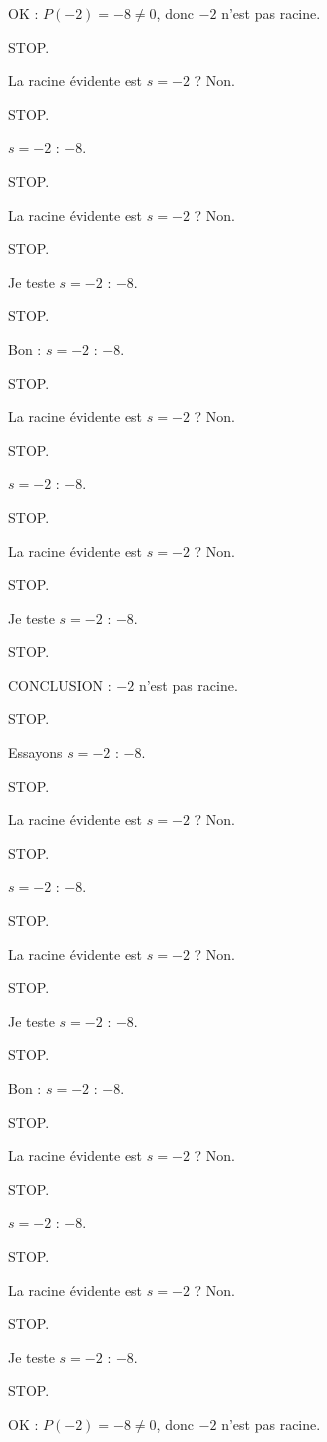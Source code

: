 \documentclass[11pt]{article}
\begin{document}
\begin{exoresolu}
\begin{enumerate}
OK : $P(-2) = -8 \neq 0$, donc $-2$ n'est pas racine. 

STOP. 

La racine évidente est $s = -2$ ? Non. 

STOP. 

$s = -2$ : $-8$. 

STOP. 

La racine évidente est $s = -2$ ? Non. 

STOP. 

Je teste $s = -2$ : $-8$. 

STOP. 

Bon : $s = -2$ : $-8$. 

STOP. 

La racine évidente est $s = -2$ ? Non. 

STOP. 

$s = -2$ : $-8$. 

STOP. 

La racine évidente est $s = -2$ ? Non. 

STOP. 

Je teste $s = -2$ : $-8$. 

STOP. 

CONCLUSION : $-2$ n'est pas racine. 

STOP. 

Essayons $s = -2$ : $-8$. 

STOP. 

La racine évidente est $s = -2$ ? Non. 

STOP. 

$s = -2$ : $-8$. 

STOP. 

La racine évidente est $s = -2$ ? Non. 

STOP. 

Je teste $s = -2$ : $-8$. 

STOP. 

Bon : $s = -2$ : $-8$. 

STOP. 

La racine évidente est $s = -2$ ? Non. 

STOP. 

$s = -2$ : $-8$. 

STOP. 

La racine évidente est $s = -2$ ? Non. 

STOP. 

Je teste $s = -2$ : $-8$. 

STOP. 

OK : $P(-2) = -8 \neq 0$, donc $-2$ n'est pas racine. 


\end{enumerate}
\end{exoresolu}
\end{document}
